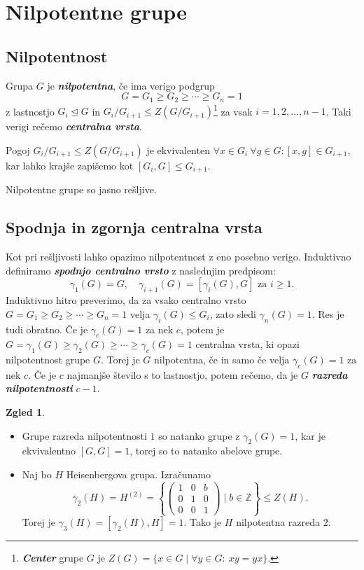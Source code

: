 \documentclass[11pt]{book}
\def\ZZ{\mathbb{Z}}
\def\definicija{\color{rdeca}\bf\em}
\theoremstyle{definition}
\theoremstyle{zgled}
\newtheorem*{zgled}{Zgled}
\theoremstyle{odprtproblem}
\theoremstyle{domacanaloga}
\theoremstyle{izrek}
\begin{document}
\section{Nilpotentne grupe}

\subsection{Nilpotentnost}

Grupa $G$ je {\definicija nilpotentna}, če ima verigo podgrup
\[
G = G_1 \geq G_2 \geq \cdots \geq G_n = 1
\]
z lastnostjo $G_i \unlhd G$ in $G_i/G_{i+1} \leq Z(G/G_{i+1})$\footnote{{\definicija Center} grupe $G$ je $Z(G) = \{ x \in G \mid \forall y \in G \colon \ xy = yx \}$.} za vsak $i = 1,2,\dots, n-1$. Taki verigi rečemo {\definicija centralna vrsta}. 

Pogoj $G_i/G_{i+1} \leq Z(G/G_{i+1})$ je ekvivalenten $\forall x \in G_i \ \forall g \in G \colon [x,g] \in G_{i+1}$, kar lahko krajše zapišemo kot $[G_i, G] \leq G_{i+1}$.

Nilpotentne grupe so jasno rešljive.

\subsection{Spodnja in zgornja centralna vrsta}

Kot pri rešljivosti lahko opazimo nilpotentnost z eno posebno verigo. Induktivno definiramo {\definicija spodnjo centralno vrsto} z naslednjim predpisom:
\[
\gamma_1(G) = G, \quad \gamma_{i+1}(G) = [\gamma_i(G), G] \text{ za $i \geq 1$.}
\]
Induktivno hitro preverimo, da za vsako centralno vrsto $G = G_1 \geq G_2 \geq \cdots \geq G_n = 1$ velja $\gamma_i(G) \leq G_i$, zato sledi $\gamma_n(G) = 1$. Res je tudi obratno. Če je $\gamma_c(G) = 1$ za nek $c$, potem je $G = \gamma_1(G) \geq \gamma_2(G) \geq \cdots \geq \gamma_c(G) = 1$ centralna vrsta, ki opazi nilpotentnost grupe $G$. Torej je $G$ nilpotentna, če in samo če velja $\gamma_c(G) = 1$ za nek $c$. Če je $c$ najmanjše število s to lastnostjo, potem rečemo, da je $G$ {\definicija razreda nilpotentnosti} $c-1$.

\begin{zgled}
\begin{itemize}
    \item Grupe razreda nilpotentnosti $1$ so natanko grupe z $\gamma_2(G) = 1$, kar je ekvivalentno $[G,G] = 1$, torej so to natanko abelove grupe.
    \item Naj bo $H$ Heisenbergova grupa. Izračunamo
    \[
    \gamma_2(H) = H^{(2)} = 
    \left\{ \begin{pmatrix}
    1 & 0 & b \\ 0 & 1 & 0 \\ 0 & 0 & 1
    \end{pmatrix} \mid b \in \ZZ \right\}
    \leq Z(H).
    \]
    Torej je $\gamma_3(H) = [\gamma_2(H), H] = 1$. Tako je $H$ nilpotentna razreda $2$.
\end{itemize}
\end{zgled}
\end{document}
